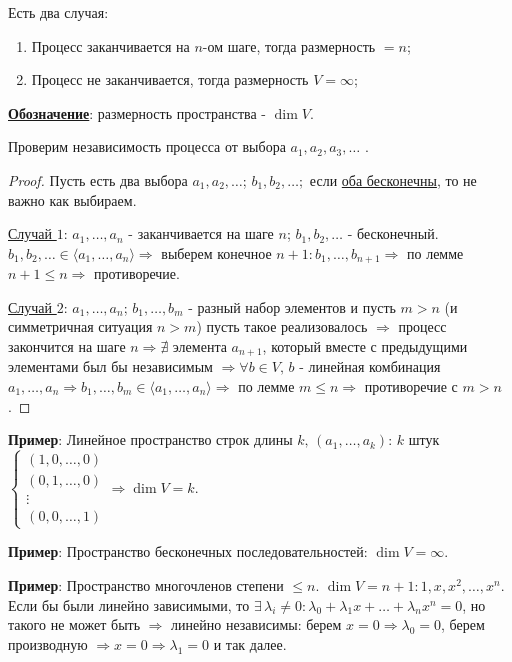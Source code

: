 \documentclass[12pt]{article}
\theoremstyle{definition}
\begin{document}
Есть два случая:
\begin{enumerate}[label ={\arabic*)}]
	\item Процесс заканчивается на $n$-ом шаге, тогда размерность $= n$;
	\item Процесс не заканчивается, тогда  размерность $V = \infty$;
\end{enumerate}
\textbf{\uline{Обозначение}}: размерность пространства - $\dim{V}$.

Проверим независимость процесса от выбора $a_1, a_2, a_3, \dotsc$ .
\begin{proof}
	Пусть есть два выбора $a_1, a_2, \dotsc$; $b_1, b_2, \dotsc;$ если \uline{оба бесконечны}, то не важно как выбираем.
	
	\uline{Случай $1$}: $a_1,\dotsc, a_n$ - заканчивается на шаге $n$; $b_1, b_2, \dotsc$ - бесконечный. $b_1, b_2,\dotsc \in \langle a_1, \dotsc,a_n \rangle \Rightarrow$ выберем конечное $n+1 \colon b_1,\dotsc, b_{n+1} \Rightarrow$ по лемме $n+1 \leq n \Rightarrow$ противоречие.
	
	\uline{Случай $2$}: $a_1,\dotsc, a_n$; $b_1,\dotsc, b_m$ - разный набор элементов и пусть $m > n$ (и симметричная ситуация $n > m$) пусть такое реализовалось $\Rightarrow$ процесс закончится на шаге $n \Rightarrow \nexists$ элемента $a_{n+1}$, который вместе с предыдущими элементами был бы независимым $\Rightarrow \forall b \in V, \, b$ - линейная комбинация $a_1,\dotsc,a_n \Rightarrow b_1,\dotsc, b_m \in \langle a_1, \dotsc, a_n \rangle \Rightarrow$ по лемме $m \leq n \Rightarrow$ противоречие с $m > n$.
\end{proof}

\textbf{Пример}: Линейное пространство строк длины $k, \, (a_1, \dotsc, a_k)$: $k$ штук
$
	\left\{\begin{array}{c}
		(1,0, \dotsc, 0) \\
		(0,1, \dotsc, 0) \\ 
		\vdots \\
		(0, 0, \dotsc, 1)
	\end{array}	\right.
\Rightarrow \dim{V} = k$.

\textbf{Пример}: Пространство бесконечных последовательностей: $\dim{V} = \infty$.

\textbf{Пример}: Пространство многочленов степени $\leq n$. $\dim{V} = n+1\colon 1,x,x^2,\dotsc,x^n$. Если бы были линейно зависимыми, то $\exists \, \lambda_i \neq 0 \colon \lambda_0 + \lambda_1 x + \dotsc + \lambda_n x^n = 0$, но такого не может быть $\Rightarrow$ линейно независимы: берем $x = 0 \Rightarrow \lambda_0 = 0$, берем производную $\Rightarrow x = 0 \Rightarrow \lambda_1 = 0$ и так далее.
\end{document}
